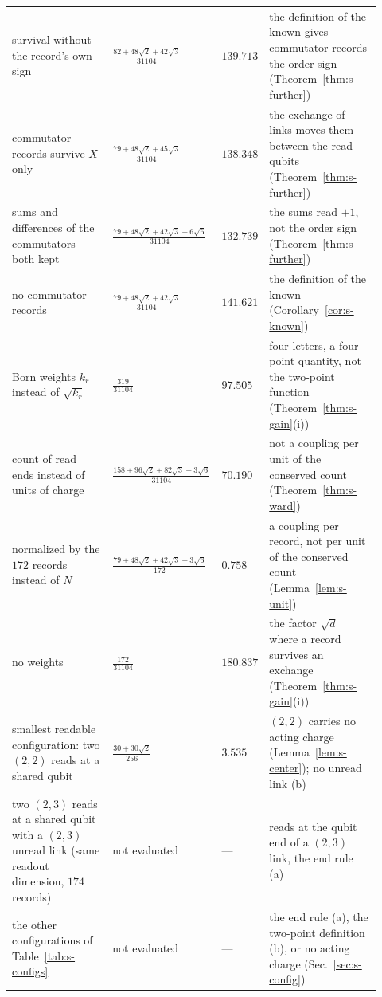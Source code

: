 \begin{table}[h]
\begin{ruledtabular}
\begin{tabular}{>{\raggedright\arraybackslash}p{0.30\linewidth}>{\raggedright\arraybackslash}p{0.21\linewidth}>{\raggedright\arraybackslash}p{0.09\linewidth}>{\raggedright\arraybackslash}p{0.32\linewidth}}
survival without the record's own sign & $\frac{82+48\sqrt{2}+42\sqrt{3}}{31104}$ & $139.713$ & the definition of the known gives commutator records the order sign (Theorem~\ref{thm:s-further}) \\
commutator records survive $X$ only & $\frac{79+48\sqrt{2}+45\sqrt{3}}{31104}$ & $138.348$ & the exchange of links moves them between the read qubits (Theorem~\ref{thm:s-further}) \\
sums and differences of the commutators both kept & $\frac{79+48\sqrt{2}+42\sqrt{3}+6\sqrt{6}}{31104}$ & $132.739$ & the sums read $+1$, not the order sign (Theorem~\ref{thm:s-further}) \\
no commutator records & $\frac{79+48\sqrt{2}+42\sqrt{3}}{31104}$ & $141.621$ & the definition of the known (Corollary~\ref{cor:s-known}) \\
Born weights $k_{r}$ instead of $\sqrt{k_{r}}$ & $\frac{319}{31104}$ & $97.505$ & four letters, a four-point quantity, not the two-point function (Theorem~\ref{thm:s-gain}(i)) \\
count of read ends instead of units of charge & $\frac{158+96\sqrt{2}+82\sqrt{3}+3\sqrt{6}}{31104}$ & $70.190$ & not a coupling per unit of the conserved count (Theorem~\ref{thm:s-ward}) \\
normalized by the $172$ records instead of $N$ & $\frac{79+48\sqrt{2}+42\sqrt{3}+3\sqrt{6}}{172}$ & $0.758$ & a coupling per record, not per unit of the conserved count (Lemma~\ref{lem:s-unit}) \\
no weights & $\frac{172}{31104}$ & $180.837$ & the factor $\sqrt{d}$ where a record survives an exchange (Theorem~\ref{thm:s-gain}(i)) \\
smallest readable configuration: two $(2,2)$ reads at a shared qubit & $\frac{30+30\sqrt{2}}{256}$ & $3.535$ & $(2,2)$ carries no acting charge (Lemma~\ref{lem:s-center}); no unread link (b) \\
two $(2,3)$ reads at a shared qubit with a $(2,3)$ unread link (same readout dimension, $174$ records) & not evaluated & --- & reads at the qubit end of a $(2,3)$ link, the end rule (a) \\
the other configurations of Table~\ref{tab:s-configs} & not evaluated & --- & the end rule (a), the two-point definition (b), or no acting charge (Sec.~\ref{sec:s-config}) \\
\end{tabular}
\end{ruledtabular}
\end{table}

